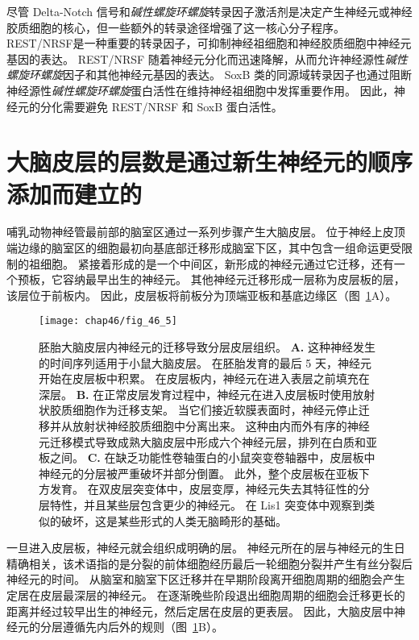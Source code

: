 尽管 Delta-Notch 信号和\textit{碱性螺旋环螺旋}转录因子激活剂是决定产生神经元或神经胶质细胞的核心，但一些额外的转录途径增强了这一核心分子程序。
 REST/NRSF是一种重要的转录因子，可抑制神经祖细胞和神经胶质细胞中神经元基因的表达。
REST/NRSF 随着神经元分化而迅速降解，从而允许神经源性\textit{碱性螺旋环螺旋}因子和其他神经元基因的表达。
SoxB 类的同源域转录因子也通过阻断神经源性\textit{碱性螺旋环螺旋}蛋白活性在维持神经祖细胞中发挥重要作用。
因此，神经元的分化需要避免 REST/NRSF 和 SoxB 蛋白活性。



\section{大脑皮层的层数是通过新生神经元的顺序添加而建立的}

哺乳动物神经管最前部的脑室区通过一系列步骤产生大脑皮层。
位于神经上皮顶端边缘的脑室区的细胞最初向基底部迁移形成脑室下区，其中包含一组命运更受限制的祖细胞。
紧接着形成的是一个中间区，新形成的神经元通过它迁移，还有一个预板，它容纳最早出生的神经元。
其他神经元迁移形成一层称为皮层板的层，该层位于前板内。
因此，皮层板将前板分为顶端亚板和基底边缘区（图~\ref{fig:46_5}A）。


\begin{figure}[htbp]
	\centering
	\texttt{[image: chap46/fig\_46\_5]}
	\caption{胚胎大脑皮层内神经元的迁移导致分层皮层组织\cite{olson2002smooth}。
		\textbf{A.} 这种神经发生的时间序列适用于小鼠大脑皮层。
		在胚胎发育的最后 5 天，神经元开始在皮层板中积累。
		在皮层板内，神经元在进入表层之前填充在深层。 
		\textbf{B.} 在正常皮层发育过程中，神经元在进入皮层板时使用放射状胶质细胞作为迁移支架。
		当它们接近软膜表面时，神经元停止迁移并从放射状神经胶质细胞中分离出来。
		 这种由内而外有序的神经元迁移模式导致成熟大脑皮层中形成六个神经元层，排列在白质和亚板之间。
		\textbf{C.} 在缺乏功能性卷轴蛋白的小鼠突变卷轴器中，皮层板中神经元的分层被严重破坏并部分倒置。
		此外，整个皮层板在亚板下方发育。
		在双皮层突变体中，皮层变厚，神经元失去其特征性的分层特性，并且某些层包含更少的神经元。
		在 Lis1 突变体中观察到类似的破坏，这是某些形式的人类无脑畸形的基础。}
	\label{fig:46_5}
\end{figure}


一旦进入皮层板，神经元就会组织成明确的层。
神经元所在的层与神经元的生日精确相关，该术语指的是分裂的前体细胞经历最后一轮细胞分裂并产生有丝分裂后神经元的时间。
从脑室和脑室下区迁移并在早期阶段离开细胞周期的细胞会产生定居在皮层最深层的神经元。
在逐渐晚些阶段退出细胞周期的细胞会迁移更长的距离并经过较早出生的神经元，然后定居在皮层的更表层。
因此，大脑皮层中神经元的分层遵循先内后外的规则（图~\ref{fig:46_5}B）。



